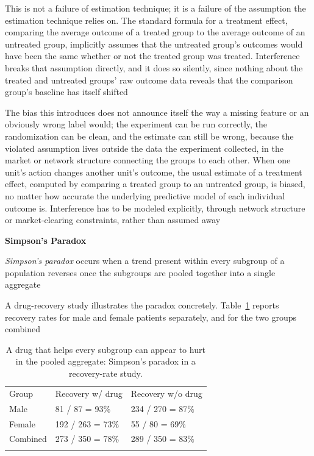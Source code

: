 This is not a failure of estimation technique; it is a failure of the assumption
the estimation technique relies on. The standard formula for a treatment effect,
comparing the average outcome of a treated group to the average outcome of an
untreated group, implicitly assumes that the untreated group's outcomes would have
been the same whether or not the treated group was treated. Interference breaks
that assumption directly, and it does so silently, since nothing about the
treated and untreated groups' raw outcome data reveals that the comparison group's
baseline has itself shifted

The bias this introduces does not announce itself the way a missing feature or
an obviously wrong label would; the experiment can be run correctly, the
randomization can be clean, and the estimate can still be wrong, because the
violated assumption lives outside the data the experiment collected, in the market
or network structure connecting the groups to each other. When one unit's action
changes another unit's outcome, the usual estimate of a treatment effect,
computed by comparing a treated group to an untreated group, is biased, no
matter how accurate the underlying predictive model of each individual outcome
is. Interference has to be modeled explicitly, through network structure or
market-clearing constraints, rather than assumed away

\textbf{Simpson's Paradox}

\begin{definition}
  \emph{Simpson's paradox} occurs when a trend present within every subgroup of
  a population reverses once the subgroups are pooled together into a single
  aggregate
\end{definition}

A drug-recovery study illustrates the paradox concretely. Table~\ref{tab:simpsons-paradox}
reports recovery rates for male and female patients separately, and for the two groups
combined

\begin{table}[!t]
  \caption{A drug that helps every subgroup can appear to hurt in the pooled
  aggregate: Simpson's paradox in a recovery-rate study.}
  \label{tab:simpsons-paradox}
  \begin{tabular}{p{2.4cm}p{4.6cm}p{4.6cm}}
    \hline
    \noalign{\smallskip} Group                            & Recovery w/ drug & Recovery w/o drug \\
    \noalign{\smallskip}\svhline\noalign{\smallskip} Male & 81 / 87 = 93\%   & 234 / 270 = 87\%  \\
    Female                                                & 192 / 263 = 73\% & 55 / 80 = 69\%    \\
    Combined                                              & 273 / 350 = 78\% & 289 / 350 = 83\%  \\
    \noalign{\smallskip}                                   \hline
    \noalign{\smallskip}
  \end{tabular}
\end{table}

